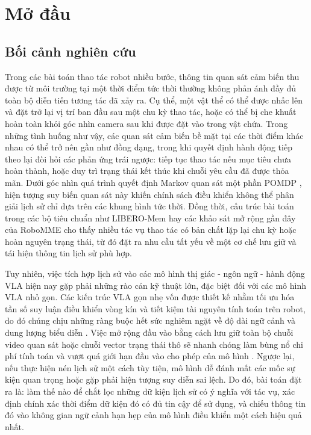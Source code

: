 \chapter{Mở đầu}

\section{Bối cảnh nghiên cứu}

Trong các bài toán thao tác robot nhiều bước, thông tin quan sát cảm biến thu được từ môi trường tại một thời điểm tức thời thường không phản ánh đầy đủ toàn bộ diễn tiến tương tác đã xảy ra. Cụ thể, một vật thể có thể được nhấc lên và đặt trở lại vị trí ban đầu sau một chu kỳ thao tác, hoặc có thể bị che khuất hoàn toàn khỏi góc nhìn camera sau khi được đặt vào trong vật chứa. Trong những tình huống như vậy, các quan sát cảm biến bề mặt tại các thời điểm khác nhau có thể trở nên gần như đồng dạng, trong khi quyết định hành động tiếp theo lại đòi hỏi các phản ứng trái ngược: tiếp tục thao tác nếu mục tiêu chưa hoàn thành, hoặc duy trì trạng thái kết thúc khi chuỗi yêu cầu đã được thỏa mãn. Dưới góc nhìn quá trình quyết định Markov quan sát một phần POMDP \cite{pomdp1998}, hiện tượng suy biến quan sát này khiến chính sách điều khiển không thể phân giải lịch sử chỉ dựa trên các khung hình tức thời. Đồng thời, cấu trúc bài toán trong các bộ tiêu chuẩn như LIBERO-Mem \cite{liberomem2025} hay các khảo sát mở rộng gần đây của RoboMME \cite{robomme2026} cho thấy nhiều tác vụ thao tác có bản chất lặp lại chu kỳ hoặc hoàn nguyên trạng thái, từ đó đặt ra nhu cầu tất yếu về một cơ chế lưu giữ và tái hiện thông tin lịch sử phù hợp.

Tuy nhiên, việc tích hợp lịch sử vào các mô hình thị giác - ngôn ngữ - hành động VLA hiện nay gặp phải những rào cản kỹ thuật lớn, đặc biệt đối với các mô hình VLA nhỏ gọn. Các kiến trúc VLA gọn nhẹ vốn được thiết kế nhằm tối ưu hóa tần số suy luận điều khiển vòng kín và tiết kiệm tài nguyên tính toán trên robot, do đó chúng chịu những ràng buộc hết sức nghiêm ngặt về độ dài ngữ cảnh và dung lượng biểu diễn \cite{smolvla2025}. Việc mở rộng đầu vào bằng cách lưu giữ toàn bộ chuỗi video quan sát hoặc chuỗi vector trạng thái thô sẽ nhanh chóng làm bùng nổ chi phí tính toán và vượt quá giới hạn đầu vào cho phép của mô hình \cite{mem2026}. Ngược lại, nếu thực hiện nén lịch sử một cách tùy tiện, mô hình dễ đánh mất các mốc sự kiện quan trọng hoặc gặp phải hiện tượng suy diễn sai lệch. Do đó, bài toán đặt ra là: làm thế nào để chắt lọc những dữ kiện lịch sử có ý nghĩa với tác vụ, xác định chính xác thời điểm dữ kiện đó có đủ tin cậy để sử dụng, và chiếu thông tin đó vào không gian ngữ cảnh hạn hẹp của mô hình điều khiển một cách hiệu quả nhất.

